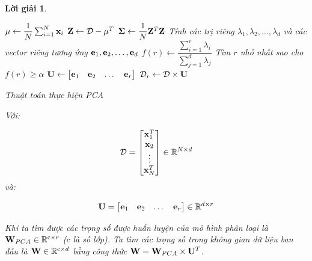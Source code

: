 \documentclass[14pt, a4paper]{article}
\theoremstyle{sltheorem}
\theoremstyle{soltheorem}
\newtheorem*{loigiai}{Lời giải}
\begin{document}
\begin{loigiai}
\begin{itemize}
        \begin{algorithm}[h!]
            \DontPrintSemicolon

            $\bold{\mu} \gets \dfrac{1}{N} \sum_{i=1}^N \bold{x}_i$\;
            $\bold{Z} \gets \mathcal{D} - \bold{\mu}^T$\;
            $\bold{\Sigma} \gets \dfrac{1}{N}\bold{Z}^T \bold{Z}$\;
            Tính các trị riêng $\lambda_1, \lambda_2, \dots, \lambda_d$ và các vector riêng tương ứng $\bold{e}_1, \bold{e}_2, \dots, \bold{e}_d$\;
            $f(r) \gets \dfrac{\sum_{i=1}^r \lambda_i}{\sum_{j=1}^d \lambda_j}$\;
            Tìm $r$ nhỏ nhất sao cho $f(r) \geq \alpha$\;
            $\bold{U} \gets \begin{bmatrix} \bold{e}_1  & \bold{e}_2  & \dots  & \bold{e}_r \end{bmatrix}$\;
            $\mathcal{D}_r \gets \mathcal{D} \times \bold{U}$\;
            \;
            \caption{Thuật toán thực hiện PCA}
            \label{alg:PCA}
        \end{algorithm}

        Với:

        \begin{equation*}
            \mathcal{D} = \begin{bmatrix}
                \bold{x}_1^T \\ \bold{x}_2 \\ \vdots \\ \bold{x}_N^T
            \end{bmatrix} \in \mathbb{R}^{N \times d}
        \end{equation*}
        và:

        \begin{equation*}
            \bold{U} = \begin{bmatrix}
                \bold{e}_1 & \bold{e}_2 & \dots & \bold{e}_r
            \end{bmatrix} \in \mathbb{R}^{d \times r}
        \end{equation*}

        Khi ta tìm được các trọng số được huấn luyện của mô hình phân loại là $\bold{W}_{PCA} \in \mathbb{R}^{\mathrm{c} \times r}$ ($c$ là số lớp).
        Ta tìm các trọng số trong không gian dữ liệu ban đầu là $\bold{W} \in \mathbb{R}^{\mathrm{c} \times d}$ bằng công thức $\bold{W} =   \bold{W}_{PCA} \times \bold{U}^T$.
    \end{itemize}
\end{loigiai}
\end{document}

